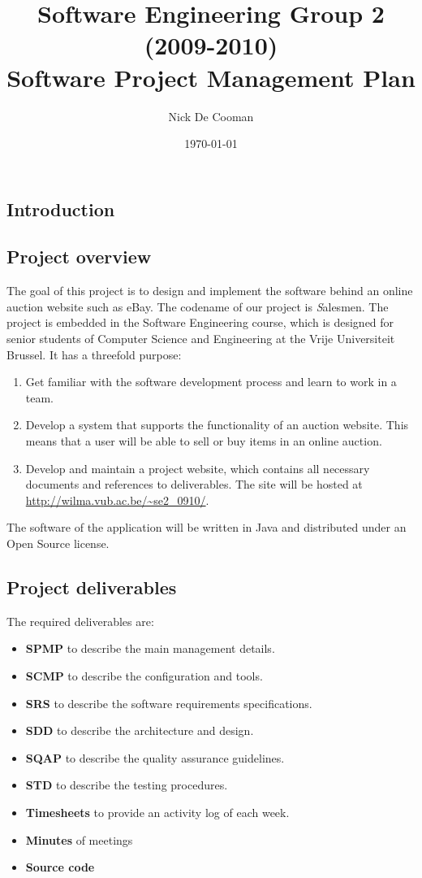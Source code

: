 \documentclass[salesmen, twoside]{../../../templates/latex/2009/softproj}
\title{Software Engineering Group 2 (2009-2010) \\Software Project Management Plan}
\author{Nick De Cooman}
\date {\today}
\begin{document}
\begin{projdoc}
	
	\chapter{Introduction}
	
		\section{Project overview}
		
			The goal of this project is to design and implement the software 
			behind an online auction website such as eBay. The codename of our project 
			is {\emph Salesmen}. The project is embedded in the Software Engineering course, 
			which is designed for senior students of Computer Science and Engineering 
			at the Vrije Universiteit Brussel. It has a threefold purpose:
			
			\begin{enumerate}
				\item Get familiar with the software development process and learn to work
				in a team.
				
				\item Develop a system that supports the functionality of an auction website. 
				This means that a user will be able to sell or buy items in an online auction. 
				
				\item Develop and maintain a project website, which contains all necessary documents and references to deliverables. The site will be hosted at
				\url{http://wilma.vub.ac.be/~se2_0910/}.
			\end{enumerate}	
			
			The software of the application will be written in Java and 
			distributed under an Open Source license.	
		
		\section{Project deliverables}
		
		The required deliverables are:
		
		\begin{itemize}
			
			\item \textbf{SPMP} to describe the main management details.
			\item \textbf{SCMP} to describe the configuration and tools.
			\item \textbf{SRS} to describe  the software requirements specifications.
			\item \textbf{SDD} to describe the architecture and design.
			\item \textbf{SQAP} to describe the quality assurance guidelines. 
			\item \textbf{STD} to describe the testing procedures.
			\item \textbf{Timesheets} to provide an activity log of each week.
			\item \textbf{Minutes} of meetings
			\item \textbf{Source code}
			

\end{itemize}
\end{projdoc}
\end{document}

